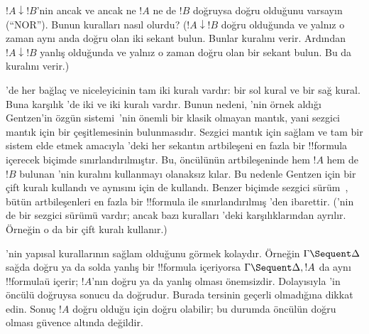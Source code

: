 \begin{prob}
$!A \downarrow !B$'nin ancak ve ancak ne $!A$ ne de $!B$ doğruysa doğru
olduğunu varsayın (``NOR''). Bunun  kuralları nasıl olurdu?
($!A \downarrow !B$ doğru olduğunda ve yalnız o zaman aynı anda doğru olan
iki sekant bulun. Bunlar \RightR{\downarrow} kuralını verir. Ardından $!A
\downarrow !B$ yanlış olduğunda ve yalnız o zaman doğru olan bir sekant
bulun. Bu da \LeftR{\downarrow} kuralını verir.)
\end{prob}

'de her bağlaç ve niceleyicinin tam iki kuralı vardır: bir sol
kural ve bir sağ kural. Buna karşılık 'de iki \LeftR{\land} ve
iki \RightR{\lor} kuralı vardır. Bunun nedeni, 'nin örnek aldığı
Gentzen'in özgün sistemi~'nin önemli bir klasik olmayan mantık,
yani sezgici mantık için bir  çeşitlemesinin bulunmasıdır. Sezgici
mantık için sağlam ve tam bir sistem elde etmek amacıyla 'deki her
sekantın artbileşeni en fazla bir !!{formula} içerecek biçimde
sınırlandırılmıştır. Bu, öncülünün artbileşeninde hem $!A$ hem de $!B$
bulunan 'nin \RightR{\lor} kuralını kullanmayı olanaksız kılar.
Bu nedenle Gentzen  için bir çift \RightR{\lor} kuralı kullandı ve
aynısını  için de kullandı. Benzer biçimde sezgici sürüm~,
bütün artbileşenleri en fazla bir !!{formula} ile sınırlandırılmış
'den ibarettir. ('nin de bir sezgici sürümü vardır; ancak
bazı kuralları 'deki karşılıklarından ayrılır. Örneğin o da bir
çift \RightR{\lor} kuralı kullanır.)

'nin yapısal kurallarının sağlam olduğunu görmek kolaydır. Örneğin
$\Gamma \Sequent \Delta$ sağda doğru ya da solda yanlış bir !!{formula}
içeriyorsa $\Gamma \Sequent \Delta, !A$ da aynı !!{formula}{}ü içerir; $!A$'nın
doğru ya da yanlış olması önemsizdir. Dolayısıyla \RightR{\Weakening}'in
öncülü doğruysa sonucu da doğrudur. Burada tersinin geçerli olmadığına
dikkat edin. Sonuç $!A$ doğru olduğu için doğru olabilir; bu durumda
öncülün doğru olması güvence altında değildir.

